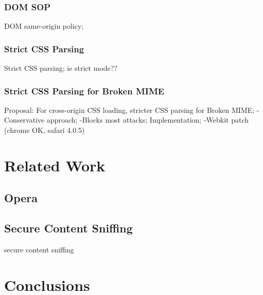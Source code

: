\documentclass{acm_proc_article-sp}
\begin{document}
\subsubsection{DOM SOP}
DOM same-origin policy;

\subsubsection{Strict CSS Parsing}
Strict CSS parsing;
ie strict mode??

\subsubsection{Strict CSS Parsing for Broken MIME}
Proposal: For cross-origin CSS loading, stricter CSS parsing for Broken MIME;
-Conservative approach;
-Blocks most attacks;
Implementation;
-Webkit patch (chrome OK, safari 4.0.5)

\section{Related Work}

\subsection{Opera}

\subsection{Secure Content Sniffing}
secure content sniffing\cite{securecontentsniffing}

\section{Conclusions}




\end{document}
